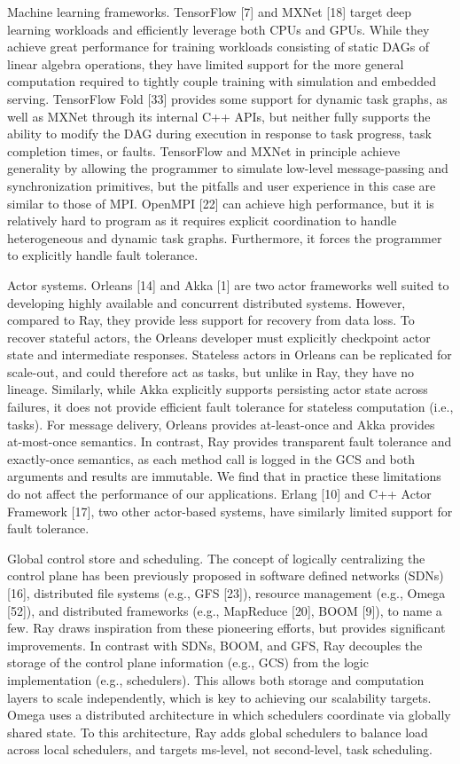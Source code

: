 \documentclass[
]{article}
\begin{document}
Machine learning frameworks. TensorFlow {[}7{]} and MXNet {[}18{]}
target deep learning workloads and efficiently leverage both CPUs and
GPUs. While they achieve great performance for training workloads
consisting of static DAGs of linear algebra operations, they have
limited support for the more general computation required to tightly
couple training with simulation and embedded serving. TensorFlow Fold
{[}33{]} provides some support for dynamic task graphs, as well as MXNet
through its internal C++ APIs, but neither fully supports the ability to
modify the DAG during execution in response to task progress, task
completion times, or faults. TensorFlow and MXNet in principle achieve
generality by allowing the programmer to simulate low-level
message-passing and synchronization primitives, but the pitfalls and
user experience in this case are similar to those of MPI. OpenMPI
{[}22{]} can achieve high performance, but it is relatively hard to
program as it requires explicit coordination to handle heterogeneous and
dynamic task graphs. Furthermore, it forces the programmer to explicitly
handle fault tolerance.

Actor systems. Orleans {[}14{]} and Akka {[}1{]} are two actor
frameworks well suited to developing highly available and concurrent
distributed systems. However, compared to Ray, they provide less support
for recovery from data loss. To recover stateful actors, the Orleans
developer must explicitly checkpoint actor state and intermediate
responses. Stateless actors in Orleans can be replicated for scale-out,
and could therefore act as tasks, but unlike in Ray, they have no
lineage. Similarly, while Akka explicitly supports persisting actor
state across failures, it does not provide efficient fault tolerance for
stateless computation (i.e., tasks). For message delivery, Orleans
provides at-least-once and Akka provides at-most-once semantics. In
contrast, Ray provides transparent fault tolerance and exactly-once
semantics, as each method call is logged in the GCS and both arguments
and results are immutable. We find that in practice these limitations do
not affect the performance of our applications. Erlang {[}10{]} and C++
Actor Framework {[}17{]}, two other actor-based systems, have similarly
limited support for fault tolerance.

Global control store and scheduling. The concept of logically
centralizing the control plane has been previously proposed in software
defined networks (SDNs) {[}16{]}, distributed file systems (e.g., GFS
{[}23{]}), resource management (e.g., Omega {[}52{]}), and distributed
frameworks (e.g., MapReduce {[}20{]}, BOOM {[}9{]}), to name a few. Ray
draws inspiration from these pioneering efforts, but provides
significant improvements. In contrast with SDNs, BOOM, and GFS, Ray
decouples the storage of the control plane information (e.g., GCS) from
the logic implementation (e.g., schedulers). This allows both storage
and computation layers to scale independently, which is key to achieving
our scalability targets. Omega uses a distributed architecture in which
schedulers coordinate via globally shared state. To this architecture,
Ray adds global schedulers to balance load across local schedulers, and
targets ms-level, not second-level, task scheduling.
\end{document}
